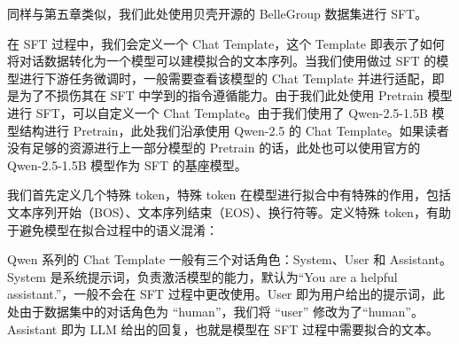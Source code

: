 \documentclass[12pt,a4paper]{book}
\begin{document}
同样与第五章类似，我们此处使用贝壳开源的 BelleGroup 数据集进行 SFT。

在 SFT 过程中，我们会定义一个 Chat Template，这个 Template
即表示了如何将对话数据转化为一个模型可以建模拟合的文本序列。当我们使用做过
SFT 的模型进行下游任务微调时，一般需要查看该模型的 Chat Template
并进行适配，即是为了不损伤其在 SFT
中学到的指令遵循能力。由于我们此处使用 Pretrain 模型进行
SFT，可以自定义一个 Chat Template。由于我们使用了 Qwen-2.5-1.5B
模型结构进行 Pretrain，此处我们沿承使用 Qwen-2.5 的 Chat
Template。如果读者没有足够的资源进行上一部分模型的 Pretrain
的话，此处也可以使用官方的 Qwen-2.5-1.5B 模型作为 SFT 的基座模型。

我们首先定义几个特殊 token，特殊 token
在模型进行拟合中有特殊的作用，包括文本序列开始（BOS）、文本序列结束（EOS）、换行符等。定义特殊
token，有助于避免模型在拟合过程中的语义混淆：

\begin{Shaded}
\begin{Highlighting}[]

\OperatorTok{=}
\OperatorTok{=}
\OperatorTok{=}
\OperatorTok{=}\StringTok{\textquotesingle{}}\StringTok{\textquotesingle{}}
\OperatorTok{=}\OperatorTok{+}
\OperatorTok{=}\OperatorTok{+}
\OperatorTok{=}\OperatorTok{+}
\end{Highlighting}
\end{Shaded}

Qwen 系列的 Chat Template 一般有三个对话角色：System、User 和
Assistant。System 是系统提示词，负责激活模型的能力，默认为``You are a
helpful assistant.''，一般不会在 SFT 过程中更改使用。User
即为用户给出的提示词，此处由于数据集中的对话角色为 ``human''，我们将
``user'' 修改为了``human''。Assistant 即为 LLM 给出的回复，也就是模型在
SFT 过程中需要拟合的文本。
\end{document}
